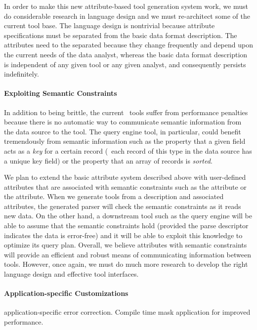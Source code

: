 \documentclass[11pt]{article}
\begin{document}
In order to make this new attribute-based tool generation system work,
we must do considerable research in language design and we must
re-architect some of the current tool base.  The language design is
nontrivial because attribute specifications must be separated from the
basic data format description.  The attributes need to the separated
because they change frequently and depend upon the current needs of
the data analyst, whereas the basic data format description is
independent of any given tool or any given analyst, and consequently
persists indefinitely.

\paragraph*{Exploiting Semantic Constraints}
In addition to being brittle, the current \pads{}\ tools suffer from
performance penalties because there is no automatic way to communicate
semantic information from the data source to the tool.  The query
engine tool, in particular, could benefit tremendously from semantic
information such as the property that a given field acts as a {\em
key} for a certain record (\ie\  each record of this type in the data
source has a unique key field) or the property that an array of
records is {\em sorted}.

We plan to extend the basic attribute system described above with
user-defined attributes that are associated with semantic constraints
such as the  attribute or the  attribute.  When we
generate tools from a \pads{} description and associated attributes,
the generated parser will check the semantic constraints as it reads
new data.  On the other hand, a downstream tool such as the query
engine will be able to assume that the semantic constraints hold
(provided the parse descriptor indicates the data is error-free) and
it will be able to exploit this knowledge to optimize its query plan.
Overall, we believe attributes with semantic constraints will provide
an efficient and robust means of communicating information between
tools.  However, once again, we must do much more research to develop
the right language design and effective tool interfaces.


\paragraph*{Application-specific Customizations}
application-specific error correction.
Compile time mask application for improved performance.
\end{document}
